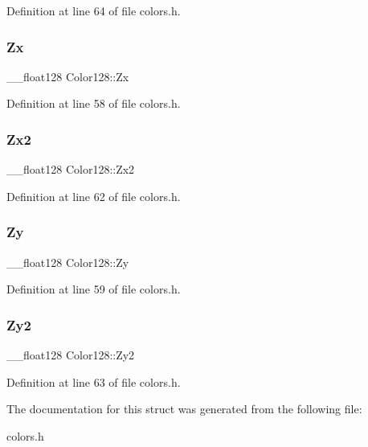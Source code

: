 Definition at line 64 of file colors.\+h.

\mbox{\label{struct_color128_a1b9594bb49e14fb65892cb73b76cfdad}} 
\subsubsection{\texorpdfstring{Zx}{Zx}}
{\footnotesize\ttfamily \+\_\+\+\_\+float128 Color128\+::\+Zx}



Definition at line 58 of file colors.\+h.

\mbox{\label{struct_color128_a332d99cef1756df3cd4fa6623a97599b}} 
\subsubsection{\texorpdfstring{Zx2}{Zx2}}
{\footnotesize\ttfamily \+\_\+\+\_\+float128 Color128\+::\+Zx2}



Definition at line 62 of file colors.\+h.

\mbox{\label{struct_color128_a7fc499c167fb236d20ad9b2e6052b4b3}} 
\subsubsection{\texorpdfstring{Zy}{Zy}}
{\footnotesize\ttfamily \+\_\+\+\_\+float128 Color128\+::\+Zy}



Definition at line 59 of file colors.\+h.

\mbox{\label{struct_color128_a8f397bfacccdd7f7c4b62de261960426}} 
\subsubsection{\texorpdfstring{Zy2}{Zy2}}
{\footnotesize\ttfamily \+\_\+\+\_\+float128 Color128\+::\+Zy2}



Definition at line 63 of file colors.\+h.



The documentation for this struct was generated from the following file\+:\begin{DoxyCompactItemize}
\item 
colors.\+h\end{DoxyCompactItemize}
